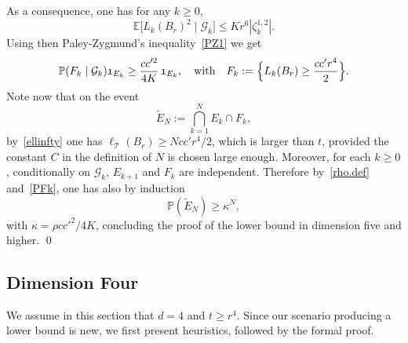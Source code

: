 \documentclass[11pt]{article}
\numberwithin{equation}{section}
\theoremstyle{plain}
\theoremstyle{definition}
\newcommand{\1}{{\text{\Large $\mathfrak 1$}}}
\begin{document}
As a consequence, one has for any $k\ge 0$,
\[
\mathbb E\big[L_k(B_r)^2\mid \mathcal G_k\big] \le Kr^6 |\zeta_k^{1,2}|.
\]
Using then Paley-Zygmund's inequality~\eqref{PZ1} we get
\begin{equation}\label{PFk}
\mathbb P(F_k \mid \mathcal G_k)\1_{E_k} \ge \frac{cc'^2}{4K}\,\1_{E_k}, \quad \text{with}\quad F_k:= \Big\{L_k(B_r)\ge \frac{cc'r^4}{2}\Big\}.
\end{equation}
Note now that on the event
\[
\tilde E_N := \bigcap_{k=1}^N E_k \cap F_k,
\]
by~\eqref{ellinfty} one has $\ell_{\mathcal T}(B_r) \ge N cc'r^4/2$, which is larger than $t$, provided the constant $C$ in the definition of $N$ is chosen
large enough. Moreover, for each $k\ge 0$, conditionally on $\mathcal G_k$, $E_{k+1}$ and $F_k$ are independent. Therefore by~\eqref{rho.def} and~\eqref{PFk}, one has also by induction
\[
\mathbb P(\tilde E_N) \ge \kappa^N,
\]
with $\kappa=\rho cc'^2/4K$, concluding the proof of the lower bound in dimension five and higher. \qed

\subsection{Dimension Four}
We assume in this section that $d=4$ and $t\ge r^4$.
Since our scenario producing a lower bound is new, we first present
heuristics, followed by the formal proof.
\end{document}
